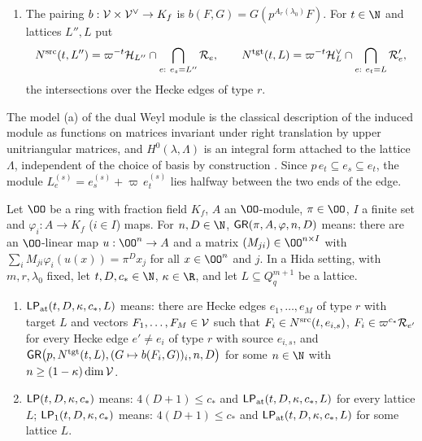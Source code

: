 \begin{definition}
\begin{enumerate}[label=(\alph*)]
$\linkGH_L=\linkGV\cap\bigotimes_sH^0(\lambda_s,L^{(s)})$. For an edge $e$ put
$L_e^{(s)}=e_s^{(s)}+\varpi^{-1}(p\,e_t)^{(s)}$, $\linkGH_{e}=\linkGV\cap\bigotimes_sH^0(\lambda_s,L_e^{(s)})$ and
\[
\linkGR_e=\varpi^{-A_r(\lambda_0)}\linkGH_e\subseteq\linkGV,\qquad
\linkGR'_e=\varpi^{-A_r(\lambda_0)}\linkGH_e^\vee\subseteq\linkGV^\vee .
\]
\item The pairing $b:\mathcal V\times\mathcal V^\vee\to K_f$ is $b(F,G)=G(p^{A_r(\lambda_0)}F)$. For $t\in\N$ and
lattices $L'',L$ put
\[
\linkGNs(t,L'')=\varpi^{-t}\linkGH_{L''}\cap\bigcap_{e:\ e_s=L''}\linkGR_e,\qquad
\linkGNt(t,L)=\varpi^{-t}\linkGH_L^\vee\cap\bigcap_{e:\ e_t=L}\linkGR'_e,
\]
the intersections over the Hecke edges of type $r$.
\end{enumerate}
\end{definition}

The model (a) of the dual Weyl module is the classical description of the induced module as functions on matrices
invariant under right translation by upper unitriangular matrices, and $H^0(\lambda,\Lambda)$ is an integral form
attached to the lattice $\Lambda$, independent of the choice of basis by construction \cite{Jantzen2003}. Since
$p\,e_t\subseteq e_s\subseteq e_t$, the module $L_e^{(s)}=e_s^{(s)}+\varpi\,e_t^{(s)}$ lies halfway between the
two ends of the edge.

\begin{definition}\label{pf:linkG:LP}
Let $\OO$ be a ring with fraction field $K_f$, $A$ an $\OO$-module, $\pi\in\OO$, $I$ a finite set and
$\varphi_i:A\to K_f$ ($i\in I$) maps. For $n,D\in\N$, $\mathsf{GR}(\pi,A,\varphi,n,D)$ means: there are an
$\OO$-linear map $u:\OO^n\to A$ and a matrix $(M_{ji})\in\OO^{n\times I}$ with
$\sum_iM_{ji}\varphi_i(u(x))=\pi^Dx_j$ for all $x\in\OO^n$ and $j$. In a Hida setting, with $m,r,\lambda_0$ fixed,
let $t,D,c_*\in\N$, $\kappa\in\R$, and let $L\subseteq Q_q^{m+1}$ be a lattice.
\begin{enumerate}[label=(\alph*)]
\item $\mathsf{LP}_{\mathrm{at}}(t,D,\kappa,c_*,L)$ means: there are Hecke edges $e_1,\dots,e_M$ of type $r$ with target $L$ and
vectors $F_1,\dots,F_M\in\mathcal V$ such that $F_i\in N^{\mathrm{src}}(t,e_{i,s})$, $F_i\in\varpi^{c_*}\mathcal R_{e'}$ for every
Hecke edge $e'\ne e_i$ of type $r$ with source $e_{i,s}$, and $\mathsf{GR}\bigl(p,N^{\mathrm{tgt}}(t,L),(G\mapsto
b(F_i,G))_i,n,D\bigr)$ for some $n\in\N$ with $n\ge(1-\kappa)\dim\mathcal V$.
\item $\mathsf{LP}(t,D,\kappa,c_*)$ means: $4(D+1)\le c_*$ and $\mathsf{LP}_{\mathrm{at}}(t,D,\kappa,c_*,L)$ for every lattice $L$;
$\mathsf{LP}_1(t,D,\kappa,c_*)$ means: $4(D+1)\le c_*$ and $\mathsf{LP}_{\mathrm{at}}(t,D,\kappa,c_*,L)$ for some lattice $L$.
\end{enumerate}
\end{definition}

